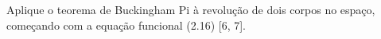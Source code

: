 Aplique o teorema de Buckingham Pi à revolução de dois corpos no espaço, começando com a equação funcional (2.16) [6, 7].
